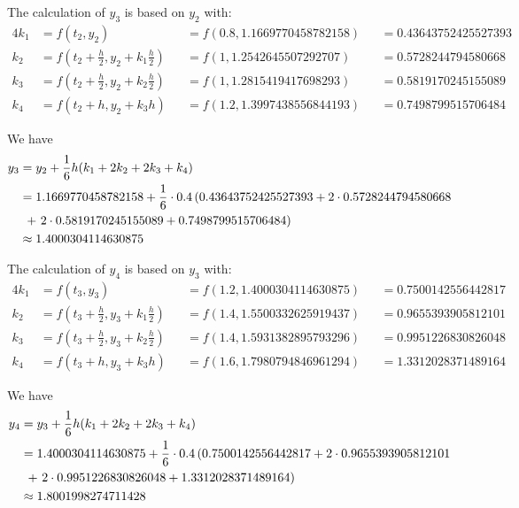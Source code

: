 \documentclass[a4paper]{article}
\numberwithin{equation}{section}
\begin{document}
The calculation of \(y_3\) is based on \(y_2\) with:
\begin{alignat*}{4}
  k_1 & = f(t_2, y_2)                                            &  & = f(0.8, 1.1669770458782158) &  & = 0.43643752425527393 \\
  k_2 & = f \left(t_2 + \frac{h}{2}, y_2 + k_1\frac{h}{2}\right) &  & = f(1, 1.2542645507292707)   &  & = 0.5728244794580668  \\
  k_3 & = f \left(t_2 + \frac{h}{2}, y_2 + k_2\frac{h}{2}\right) &  & = f(1, 1.2815419417698293)   &  & = 0.5819170245155089  \\
  k_4 & = f(t_2 + h, y_2 + k_3h)                                 &  & = f(1.2, 1.3997438556844193) &  & = 0.7498799515706484
\end{alignat*}

We have
\begin{align*}
  y_3 & = y_2 + \frac{1}{6}h(k_1 + 2k_2 + 2k_3 + k_4)                                                             \\
      & = 1.1669770458782158 + \frac{1}{6} \cdot 0.4\left(0.43643752425527393 + 2 \cdot 0.5728244794580668\right. \\
      & \ \left.+\ 2 \cdot 0.5819170245155089 + 0.7498799515706484\vphantom{1}\right)                             \\
      & \approx 1.4000304114630875
\end{align*}

The calculation of \(y_4\) is based on \(y_3\) with:
\begin{alignat*}{4}
  k_1 & = f(t_3, y_3)                                            &  & = f(1.2, 1.4000304114630875) &  & = 0.7500142556442817 \\
  k_2 & = f \left(t_3 + \frac{h}{2}, y_3 + k_1\frac{h}{2}\right) &  & = f(1.4, 1.5500332625919437) &  & = 0.9655393905812101 \\
  k_3 & = f \left(t_3 + \frac{h}{2}, y_3 + k_2\frac{h}{2}\right) &  & = f(1.4, 1.5931382895793296) &  & = 0.9951226830826048 \\
  k_4 & = f(t_3 + h, y_3 + k_3h)                                 &  & = f(1.6, 1.7980794846961294) &  & = 1.3312028371489164
\end{alignat*}

We have
\begin{align*}
  y_4 & = y_3 + \frac{1}{6}h(k_1 + 2k_2 + 2k_3 + k_4)                                                            \\
      & = 1.4000304114630875 + \frac{1}{6} \cdot 0.4\left(0.7500142556442817 + 2 \cdot 0.9655393905812101\right. \\
      & \ \left.+\ 2 \cdot 0.9951226830826048 + 1.3312028371489164\vphantom{1}\right)                            \\
      & \approx 1.8001998274711428
\end{align*}
\end{document}
